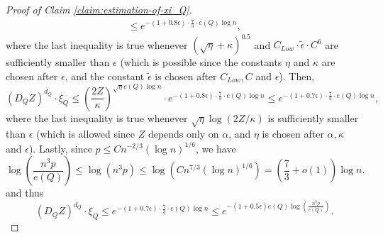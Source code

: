 \documentclass[11pt,a4paper,oneside,reqno]{amsart}
\newcommand{\1}{\mathbbm{1}} %
\renewcommand{\le}{\leqslant}
\begin{document}
\begin{proof}[Proof of Claim \ref{claim:estimation-of-xi_Q}]
\begin{align*}
        \le e^{-(1 + 0.8\epsilon) \cdot \frac{7}{3} \cdot e(Q) \log n},
    \end{align*}
    where the last inequality is true whenever $\left(\sqrt{\eta}+\kappa\right)^{0.5}$ and $C_{Low} \cdot \tilde{\epsilon} \cdot C^6$ are sufficiently smaller than $\epsilon$ (which is possible since the constants $\eta$ and $\kappa$ are chosen after $\epsilon$, and the constant $\tilde{\epsilon}$ is chosen after $C_{Low}, C$ and $\epsilon$). Then,
    \[
        (D_Q Z)^{d_Q} \cdot \xi_Q \le \left(\frac{2Z}{\kappa}\right)^{\sqrt{\eta} e(Q) \log n} \cdot e^{-(1 + 0.8\epsilon) \cdot \frac{7}{3} \cdot e(Q) \log n} \le e^{-(1 + 0.7\epsilon) \cdot \frac{7}{3} \cdot e(Q) \log n},
    \]
    where the last inequality is true whenever $\sqrt{\eta} \log\left(2Z/\kappa\right)$ is sufficiently smaller than $\epsilon$ (which is allowed since $Z$ depends only on $\alpha$, and $\eta$ is chosen after $\alpha, \kappa$ and $\epsilon$). Lastly, since $p \le C n^{-2/3} \left(\log n\right)^{1/6}$, we have
    \[
        \log\left(\frac{n^3 p}{e(Q)}\right) \le \log\left(n^3 p\right) \le \log\left(C n^{7/3} \left(\log n\right)^{1/6}\right) = \left(\frac{7}{3} + o(1)\right) \log n.
    \]
    and thus
    \[
        (D_Q Z)^{d_Q} \cdot \xi_Q \le  e^{-(1 + 0.7\epsilon) \cdot \frac{7}{3} \cdot e(Q) \log n} \le e^{-(1 + 0.5\epsilon) e(Q) \log\left(\frac{n^3 p }{e(Q)}\right)}.
    \]



\end{proof}
\end{document}
